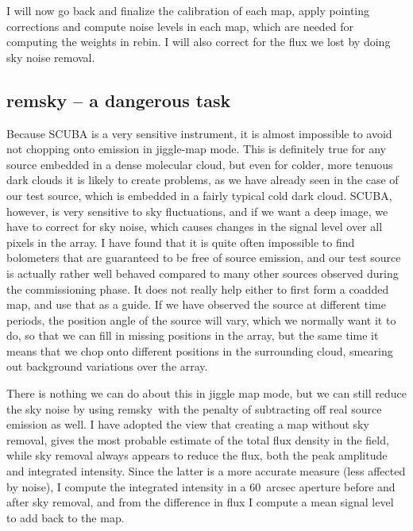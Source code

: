 \documentclass[twoside,11pt]{article}
\newcommand{\task}[1]{\textsf{#1}}
\newcommand{\rebin}{\xref{\task{rebin}}{sun216}{REBIN}}
\newcommand{\remsky}{\xref{\task{remsky}}{sun216}{REMSKY}}
\newcommand{\xref}[3]{#1}
\newcommand{\xlabel}[1]{}
\begin{document}
{I will now go back and finalize the calibration of each map, apply
pointing corrections and compute noise levels in each map, which are
needed for computing the weights in \rebin. I will 
also correct for the flux we lost by doing sky noise removal. 

\subsection{\xlabel{remsky_--_a_dangerous_task}remsky -- a dangerous task}

Because SCUBA is a very sensitive instrument, it is almost impossible to
avoid not chopping onto emission in jiggle-map mode. This is definitely
true for any source embedded in a dense molecular cloud, but even for
colder, more tenuous dark clouds it is likely to create problems, as we
have already seen in the case of our test source, which is embedded in a
fairly typical cold dark cloud. SCUBA, however, is very sensitive to sky
fluctuations, and if we want a deep image, we have to correct for sky
noise, which causes changes in the signal level over all pixels in the
array. I have found that it is quite often impossible to find bolometers
that are guaranteed to be free of source emission, and our test source
is actually rather well behaved compared to many other sources observed
during the commissioning phase. It does not really help either to first
form a coadded map, and use that as a guide. If we have observed the
source at different time periods, the position angle of the source will
vary, which we normally want it to do, so that we can fill in missing
positions in the array, but the same time it means that we chop onto
different positions in the surrounding cloud, smearing out background
variations over the array.

There is nothing we can do about this in jiggle map mode, but we can still
reduce the sky noise by using \remsky\ with the penalty of subtracting off
real source emission as well. I have adopted the view that creating a map
without sky removal, gives the most probable estimate of the total flux
density in the field, while sky removal always appears to reduce the
flux, both the peak amplitude and integrated intensity. Since the latter is
a more accurate measure (less affected by noise), I compute the integrated
intensity in a 60~arcsec aperture before and after sky removal, and from the 
difference in flux I compute a mean signal level to add back to the map.

}
\end{document}
